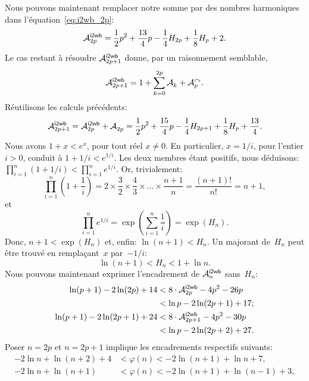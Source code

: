 Nous pouvons maintenant remplacer notre somme par des nombres
harmoniques dans l'équation~\eqref{eq:i2wb_2p}:
\begin{equation*}
\M{\fun{i2wb}}{2p}
  = \frac{1}{2}{p^2} + \frac{13}{4}{p} - \frac{1}{4}{H_{2p}}
    + \frac{1}{8}{H_p} + 2.
\end{equation*}
Le cas restant à résoudre \(\M{\fun{i2wb}}{2p+1}\) donne, par un
raisonnement semblable,
\begin{equation*}
\M{\fun{i2wb}}{2p+1}
  = 1 + \sum_{k=0}^{2p}{\M{}{k}} + \M{\curvearrowright}{p}.
\end{equation*}
Réutilisons les calculs précédents:
\begin{equation*}
\M{\fun{i2wb}}{2p+1}
   = \M{\fun{i2wb}}{2p} + \M{}{2p}
   = \frac{1}{2}{p^2} + \frac{15}{4}{p} - \frac{1}{4}{H_{2p+1}}
     + \frac{1}{8}{H_p} + \frac{13}{4}.
\end{equation*}
Nous avons \(1 + x < e^x\), pour tout réel \(x \neq 0\). En
particulier, \(x=1/i\), pour l'entier \(i>0\), conduit à \(1 + 1/i <
e^{1/i}\). Les deux membres étant positifs, nous déduisons:
\(\prod_{i=1}^{n}(1+1/i) < \prod_{i=1}^{n}{e^{1/i}}\). Or,
trivialement:
\begin{equation*}
  \prod_{i=1}^{n}\left(1+\frac{1}{i}\right)
  = 2 \times \frac{3}{2} \times \frac{4}{3}
  \times \dots \times \frac{n+1}{n} =  \frac{(n+1)!}{n!} = n + 1,
\end{equation*}
et
\begin{equation*}
  \prod_{i=1}^{n}{e^{1/i}} =
  \exp\left(\sum_{i=1}^{n}\frac{1}{i}\right) = \exp(H_n).
\end{equation*}
Donc, \(n+1 < \exp(H_n)\) et, enfin: \(\ln(n+1) < H_n\). Un majorant
de~\(H_n\) peut être trouvé en remplaçant~\(x\) par~\(-1/i\):
\begin{equation}
\ln(n+1) < H_n < 1 + \ln n.\label{ineq:Hn}
\end{equation}
Nous pouvons maintenant exprimer l'encadrement de
\(\M{\fun{i2wb}}{n}\) sans~\(H_n\):
\begin{align*}
\ln(p+1) - 2\ln(2p) + 14
&< 8 \cdot \M{\fun{i2wb}}{2p} - 4{p^2} - 26{p}\\
& < \ln p - 2\ln(2p+1) + 17;\\
\ln(p+1) - 2\ln(2p+1) + 24
&< 8 \cdot \M{\fun{i2wb}}{2p+1} - 4{p^2} - 30{p}\\
&< \ln{p} - 2\ln(2p+2) + 27.
\end{align*}
Poser \(n=2p\) et \(n=2p+1\) implique les encadrements respectifs
suivants:
\begin{align*}
-2\ln n + \ln(n+2) + 4 &< \varphi(n) < -2\ln(n+1) + \ln n + 7,\\
-2\ln n + \ln(n+1)     &< \varphi(n) < -2\ln(n+1) + \ln(n-1) + 3,
\end{align*}
